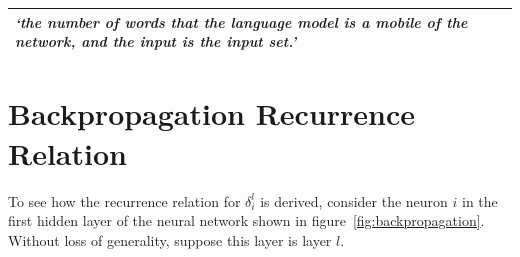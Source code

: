 \documentclass[a4paper, 12pt]{report}
\newcommand{\tit}[1]{\textit{#1}}
\begin{document}
\begin{center}
\begin{tabular}{C{15cm}}
	\hline
	\tit{`the number of words that the language model is a mobile of the network, and the input is the input set.'} \\ \hline
\end{tabular}
\end{center}


\newpage
{}



\appendix

\chapter{Backpropagation Recurrence Relation} \label{appendix:bp_recurrence}

To see how the recurrence relation for $\delta_i^l$ is derived, consider the neuron $i$ in the first hidden layer of the neural network shown in figure~\ref{fig:backpropagation}. Without loss of generality, suppose this layer is layer $l$. \\
\end{document}
